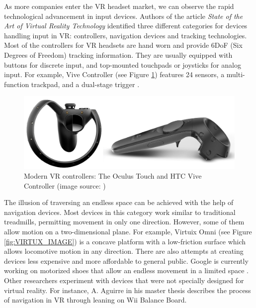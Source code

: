 As more companies enter the VR headset market, we can observe the rapid technological advancement in input devices. Authors of the article \textit{State of the Art of Virtual Reality Technology} \cite{VR_TECHNOLOGY} identified three different categories for devices handling input in VR: controllers, navigation devices and tracking technologies. Most of the controllers for VR headsets are hand worn and provide 6DoF (Six Degrees of Freedom) tracking information. They are usually equipped with buttons for discrete input, and top-mounted touchpads or joysticks for analog input. For example, Vive Controller (see Figure \ref{fig:CONTROLLERS_IMAGE}) features 24 sensors, a multi-function trackpad, and a dual-stage trigger \cite{VIVE_IMAGE}.

\begin{figure}[th]
\centering
\includegraphics[width=1\textwidth]{img/modern_controllers.png}
\caption{Modern VR controllers: The Oculus Touch and HTC Vive Controller (image source: \cite{VR_TECHNOLOGY}\cite{VIVE_IMAGE})}
\label{fig:CONTROLLERS_IMAGE}
\end{figure}

The illusion of traversing an endless space can be achieved with the help of navigation devices. Most devices in this category work similar to traditional treadmills, permitting movement in only one direction. However, some of them allow motion on a two-dimensional plane. For example, Virtuix Omni (see Figure \ref{fig:VIRTUX_IMAGE}) is a concave platform with a low-friction surface which allows locomotive motion in any direction. There are also attempts at creating devices less expensive and more affordable to general public. Google is currently working on motorized shoes that allow an endless movement in a limited space \cite{VR_SHOES}. Other researchers experiment with devices that were not specially designed for virtual reality. For instance, A. Aguirre in his master thesis \cite{JOYSTICK} describes the process of navigation in VR through leaning on Wii Balance Board.

